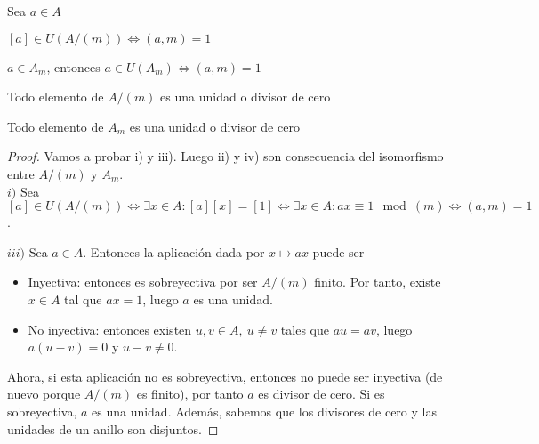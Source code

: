 \begin{nprop} Sea $a \in A$
	\begin{nlist}
	\item $[a] \in U(A/(m)) \iff (a,m) = 1 $
	\item $a \in A_m$, entonces $a \in U(A_m) \iff (a,m) = 1$
	\item Todo elemento de $A/(m)$ es una unidad o divisor de cero
	\item Todo elemento de $A_m$ es una unidad o divisor de cero
\end{nlist}
\end{nprop}
\begin{proof}
	Vamos a probar i) y iii). Luego ii) y iv) son consecuencia del isomorfismo entre $A/(m)$ y $A_m$.\\

        $\boxed{i)}$ Sea $[a] \in U(A/(m)) \iff \exists x \in A: [a][x] = [1] \iff \exists x \in A : ax \equiv 1\mod(m) \iff (a,m) = 1$.

	$\boxed{iii)}$ Sea $a \in A$. Entonces la aplicación dada por $x \mapsto ax$ puede ser

        \begin{itemize}
        \item Inyectiva: entonces es sobreyectiva por ser $A/(m)$ finito. Por tanto, existe $x \in A$ tal que $ax = 1$, luego $a$ es una unidad.
        \item No inyectiva: entonces existen $u,v \in A, \ u \ne v$ tales que $au = av$, luego $a(u-v) = 0$ y $u-v \ne 0$.
        \end{itemize}

        Ahora, si esta aplicación no es sobreyectiva, entonces no puede ser inyectiva (de nuevo porque $A/(m)$ es finito), por tanto $a$ es divisor de cero.
        Si es sobreyectiva, $a$ es una unidad. Además, sabemos que los divisores de cero y las unidades de un anillo son disjuntos.
\end{proof}


